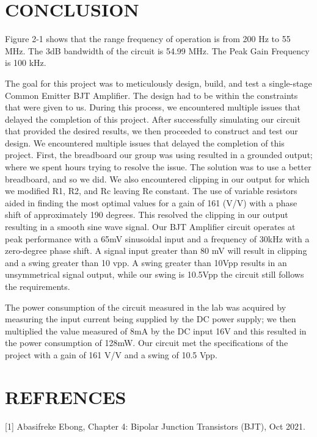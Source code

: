 \documentclass[conference]{IEEEtran}
\begin{document}
\section{CONCLUSION}
Figure 2-1 shows that the range frequency of operation is from 200 Hz to 55 MHz.  The 3dB bandwidth of the circuit is 54.99 MHz.  The Peak Gain Frequency is 100 kHz.
\par
\vspace{12pt} %
The goal for this project was to meticulously design, build, and test a single-stage Common Emitter BJT Amplifier.  The design had to be within the constraints that were given to us.  During this process, we encountered multiple issues that delayed the completion of this project.  After successfully simulating our circuit that provided the desired results, we then proceeded to construct and test our design.  We encountered multiple issues that delayed the completion of this project.  First, the breadboard our group was using resulted in a grounded output; where we spent hours trying to resolve the issue.  The solution was to use a better breadboard, and so we did.  We also encountered clipping in our output for which we modified R1, R2, and Rc leaving Re constant.  The use of variable resistors aided in finding the most optimal values for a gain of 161 (V/V) with a phase shift of approximately 190 degrees. This resolved the clipping in our output resulting in a smooth sine wave signal.  Our BJT Amplifier circuit operates at peak performance with a 65mV sinusoidal input and a frequency of 30kHz with a zero-degree phase shift.  A signal input greater than 80 mV will result in clipping and a swing greater than 10 vpp.  A swing greater than 10Vpp results in an unsymmetrical signal output, while our swing is 10.5Vpp the circuit still follows the requirements.

\par
\vspace{12pt} %
The power consumption of the circuit measured in the lab was acquired by measuring the input current being supplied by the DC power supply; we then multiplied the value measured of 8mA by the DC input 16V and this resulted in the power consumption of 128mW.  Our circuit met the specifications of the project with a gain of 161 V/V and a swing of 10.5 Vpp.  


\section{REFRENCES}
[1] Abasifreke Ebong, Chapter 4: Bipolar Junction
Transistors (BJT), Oct 2021.
\end{document}
